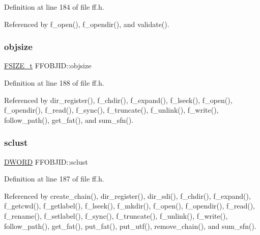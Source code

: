 Definition at line 184 of file ff.\+h.



Referenced by f\+\_\+open(), f\+\_\+opendir(), and validate().

\mbox{\label{structFFOBJID_a83c51ba99687054f0cc653b45f195268}} 
\subsubsection{\texorpdfstring{objsize}{objsize}}
{\footnotesize\ttfamily \hyperlink{ff_8h_a3fc0992ad7436250b6b1a0592214b7f2}{F\+S\+I\+Z\+E\+\_\+t} F\+F\+O\+B\+J\+I\+D\+::objsize}



Definition at line 188 of file ff.\+h.



Referenced by dir\+\_\+register(), f\+\_\+chdir(), f\+\_\+expand(), f\+\_\+lseek(), f\+\_\+open(), f\+\_\+opendir(), f\+\_\+read(), f\+\_\+sync(), f\+\_\+truncate(), f\+\_\+unlink(), f\+\_\+write(), follow\+\_\+path(), get\+\_\+fat(), and sum\+\_\+sfn().

\mbox{\label{structFFOBJID_ad990393e2ddf16f73671ded4b751becb}} 
\subsubsection{\texorpdfstring{sclust}{sclust}}
{\footnotesize\ttfamily \hyperlink{ff_8h_ad342ac907eb044443153a22f964bf0af}{D\+W\+O\+RD} F\+F\+O\+B\+J\+I\+D\+::sclust}



Definition at line 187 of file ff.\+h.



Referenced by create\+\_\+chain(), dir\+\_\+register(), dir\+\_\+sdi(), f\+\_\+chdir(), f\+\_\+expand(), f\+\_\+getcwd(), f\+\_\+getlabel(), f\+\_\+lseek(), f\+\_\+mkdir(), f\+\_\+open(), f\+\_\+opendir(), f\+\_\+read(), f\+\_\+rename(), f\+\_\+setlabel(), f\+\_\+sync(), f\+\_\+truncate(), f\+\_\+unlink(), f\+\_\+write(), follow\+\_\+path(), get\+\_\+fat(), put\+\_\+fat(), put\+\_\+utf(), remove\+\_\+chain(), and sum\+\_\+sfn().

\mbox{\label{structFFOBJID_aa7bfa8dd8958d11df042a67e1da25f63}} 
